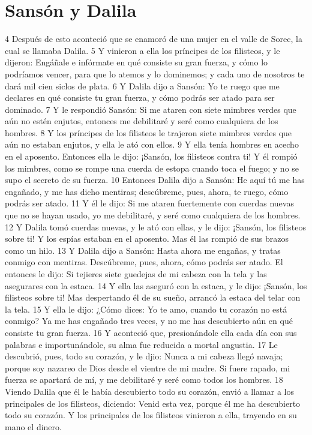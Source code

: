 \section*{Sansón y Dalila}

4 Después de esto aconteció que se enamoró de una mujer en el valle de Sorec, la cual se llamaba Dalila.
5 Y vinieron a ella los príncipes de los filisteos, y le dijeron: Engáñale e infórmate en qué consiste su gran fuerza, y cómo lo podríamos vencer, para que lo atemos y lo dominemos; y cada uno de nosotros te dará mil cien siclos de plata.
6 Y Dalila dijo a Sansón: Yo te ruego que me declares en qué consiste tu gran fuerza, y cómo podrás ser atado para ser dominado.
7 Y le respondió Sansón: Si me ataren con siete mimbres verdes que aún no estén enjutos, entonces me debilitaré y seré como cualquiera de los hombres.
8 Y los príncipes de los filisteos le trajeron siete mimbres verdes que aún no estaban enjutos, y ella le ató con ellos.
9 Y ella tenía hombres en acecho en el aposento. Entonces ella le dijo: ¡Sansón, los filisteos contra ti! Y él rompió los mimbres, como se rompe una cuerda de estopa cuando toca el fuego; y no se supo el secreto de su fuerza.
10 Entonces Dalila dijo a Sansón: He aquí tú me has engañado, y me has dicho mentiras; descúbreme, pues, ahora, te ruego, cómo podrás ser atado.
11 Y él le dijo: Si me ataren fuertemente con cuerdas nuevas que no se hayan usado, yo me debilitaré, y seré como cualquiera de los hombres.
12 Y Dalila tomó cuerdas nuevas, y le ató con ellas, y le dijo: ¡Sansón, los filisteos sobre ti! Y los espías estaban en el aposento. Mas él las rompió de sus brazos como un hilo.
13 Y Dalila dijo a Sansón: Hasta ahora me engañas, y tratas conmigo con mentiras. Descúbreme, pues, ahora, cómo podrás ser atado. El entonces le dijo: Si tejieres siete guedejas de mi cabeza con la tela y las asegurares con la estaca.
14 Y ella las aseguró con la estaca, y le dijo: ¡Sansón, los filisteos sobre ti! Mas despertando él de su sueño, arrancó la estaca del telar con la tela.
15 Y ella le dijo: ¿Cómo dices: Yo te amo, cuando tu corazón no está conmigo? Ya me has engañado tres veces, y no me has descubierto aún en qué consiste tu gran fuerza.
16 Y aconteció que, presionándole ella cada día con sus palabras e importunándole, su alma fue reducida a mortal angustia.
17 Le descubrió, pues, todo su corazón, y le djio: Nunca a mi cabeza llegó navaja; porque soy nazareo de Dios desde el vientre de mi madre. Si fuere rapado, mi fuerza se apartará de mí, y me debilitaré y seré como todos los hombres.
18 Viendo Dalila que él le había descubierto todo su corazón, envió a llamar a los principales de los filisteos, diciendo: Venid esta vez, porque él me ha descubierto todo su corazón. Y los principales de los filisteos vinieron a ella, trayendo en su mano el dinero.
